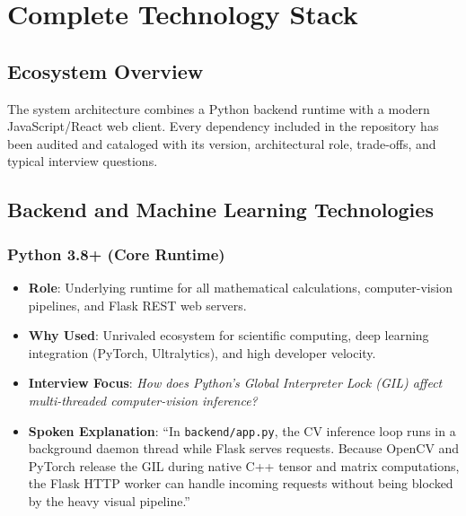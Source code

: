 \documentclass[11pt,a4paper,oneside]{report}
\begin{document}


\chapter{Complete Technology Stack}

\section{Ecosystem Overview}
The system architecture combines a Python backend runtime with a modern JavaScript/React web client. Every dependency included in the repository has been audited and cataloged with its version, architectural role, trade-offs, and typical interview questions.

\section{Backend and Machine Learning Technologies}

\subsection{Python 3.8+ (Core Runtime)}
\begin{itemize}[leftmargin=*]
    \item \textbf{Role}: Underlying runtime for all mathematical calculations, computer-vision pipelines, and Flask REST web servers.
    \item \textbf{Why Used}: Unrivaled ecosystem for scientific computing, deep learning integration (PyTorch, Ultralytics), and high developer velocity.
    \item \textbf{Interview Focus}: \textit{How does Python's Global Interpreter Lock (GIL) affect multi-threaded computer-vision inference?}
    \item \textbf{Spoken Explanation}: ``In \texttt{backend/app.py}, the CV inference loop runs in a background daemon thread while Flask serves requests. Because OpenCV and PyTorch release the GIL during native C++ tensor and matrix computations, the Flask HTTP worker can handle incoming requests without being blocked by the heavy visual pipeline.''
\end{itemize}
\end{document}
